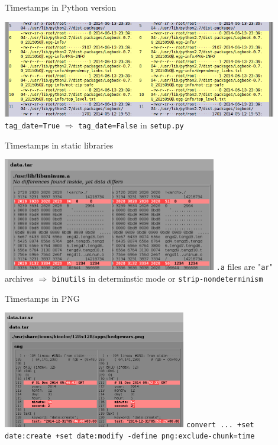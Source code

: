 \documentclass[14pt]{beamer}
\begin{document}
\begin{frame}{Timestamps in Python version}
 \begin{center}
  \includegraphics[width=0.9\textwidth]{images/examples/timestamps_in_python_version.png}
  \vfill
  \texttt{tag\_date=True} $\Longrightarrow$ \texttt{tag\_date=False} in \texttt{setup.py}
 \end{center}
\end{frame}

\begin{frame}{Timestamps in static libraries}
 \begin{center}
  \includegraphics[width=0.7\textwidth]{images/examples/timestamps_in_static_library.png}
  \vfill
  \texttt{.a} files are "\texttt{ar}" archives $\Longrightarrow$ \texttt{binutils} in determinstic mode or \texttt{strip-nondeterminism}
 \end{center}
\end{frame}

\begin{frame}{Timestamps in PNG}
 \begin{center}
  \includegraphics[width=0.6\textwidth]{images/examples/timestamps_in_png.png}
  \vfill
  \texttt{convert ... +set date:create +set date:modify -define png:exclude-chunk=time}
 \end{center}
\end{frame}
\end{document}
